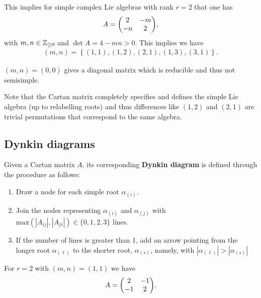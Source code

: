 This implies for simple complex Lie algebras with rank $r = 2$ that one has
\begin{align}
    A = \mqty( 2 & -m \\ -n & 2)
,\end{align}
with $m,n \in \mathbb{Z}_{\geq 0}$ and $\det A = 4 - m n > 0$. This implies we have
\begin{align}
    \left( m,n \right) = \left\{ \left( 1,1 \right) , \left( 1,2 \right) , \left( 2,1 \right) , \left( 1,3 \right) , \left( 3,1 \right)  \right\} 
.\end{align}
\begin{note}
    $\left( m,n \right) = \left( 0,0 \right) $ gives a diagonal matrix which is reducible and thus not semisimple.
\end{note}

Note that the Cartan matrix completely specifies and defines the simple Lie algebra (up to relabelling roots) and thus differences like $\left( 1,2 \right) $ and $\left( 2,1 \right) $ are trivial permutations that correspond to the same algebra.

\subsection{Dynkin diagrams}

\begin{definition}
    Given a Cartan matrix $A$, its corresponding \textbf{Dynkin diagram} is defined through the procedure as follows:
    \begin{enumerate}[label=\roman*)]
        \item Draw a node for each simple root $\alpha_{\left( i \right) }$.
        \item Join the nodes representing $\alpha_{\left( i \right) }$ and $\alpha_{\left( j \right) }$ with $\text{max}\left( \left| A_{ij} \right| , \left| A_{ji} \right|  \right) \in \{0, 1, 2, 3\} $ lines.
        \item If the number of lines is greater than 1, add an arrow pointing from the longer root $\alpha_{\left( \ell \right) }$ to the shorter root, $\alpha_{\left( s \right) }$, namely, with $\left| \alpha_{\left( \ell \right) } \right| > \left| \alpha_{\left( s \right) } \right| $
    \end{enumerate}
\end{definition}

\begin{example}
    For $r = 2$ with $\left( m,n \right) = \left( 1,1 \right) $ we have
    \begin{align}
        A = \mqty( 2 & -1 \\ -1 & 2 )
    .\end{align}
\end{example}


